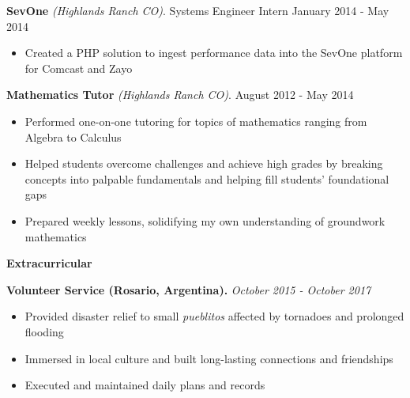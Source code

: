 \documentclass[letterpaper,11pt]{article}
\begin{document}
\textbf{SevOne} \textit{(Highlands Ranch CO)}. Systems Engineer Intern \hfill January 2014 - May 2014
\begin{itemize}[noitemsep,topsep=0pt]
	\item Created a PHP solution to ingest performance data into the SevOne platform for Comcast and Zayo\\
\end{itemize}

\textbf{Mathematics Tutor} \textit{(Highlands Ranch CO)}. \hfill August 2012 - May 2014
\begin{itemize}[noitemsep,topsep=0pt]
	\item Performed one-on-one tutoring for topics of mathematics ranging from Algebra to Calculus
	\item Helped students overcome challenges and achieve high grades by breaking concepts into palpable fundamentals and helping fill students' foundational gaps
	\item Prepared weekly lessons, solidifying my own understanding of groundwork mathematics\\
\end{itemize}




\begin{Large}\textbf{\clearpage Extracurricular}\end{Large}

\textbf{Volunteer Service (Rosario, Argentina).} \textit{October 2015 - October 2017}
\begin{itemize}[noitemsep,topsep=0pt]
	\item Provided disaster relief to small \textit{pueblitos} affected by tornadoes and prolonged flooding
	\item Immersed in local culture and built long-lasting connections and friendships
	\item Executed and maintained daily plans and records\\
\end{itemize}
\end{document}
